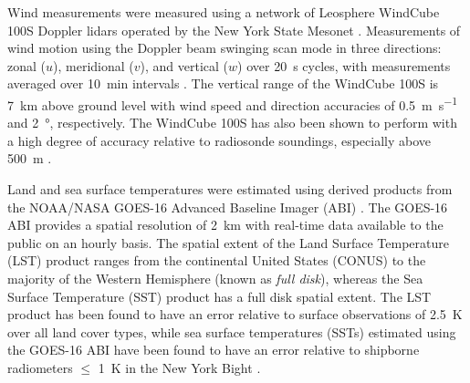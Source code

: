 Wind measurements were measured using a network of Leosphere WindCube 100S Doppler lidars operated by the New York State Mesonet \citep{brotzge2020}. Measurements of wind motion using the Doppler beam swinging scan mode in three directions: zonal ($u$), meridional ($v$), and vertical ($w$) over \SI{20}{\second} cycles, with measurements averaged over \SI{10}{\minute} intervals \citep{shrestha2021}. The vertical range of the WindCube 100S is \SI{7}{\kilo\meter} above ground level with wind speed and direction accuracies of \SI{0.5}{\meter\per\second} and \SI{2}{\degree}, respectively. The WindCube 100S has also been shown to perform with a high degree of accuracy relative to radiosonde soundings, especially above \SI{500}{\meter} \citep{kumer2014}.

Land and sea surface temperatures were estimated using derived products from the NOAA/NASA GOES-16 Advanced Baseline Imager (ABI) \citep{ignatov2010, yu2008}. The GOES-16 ABI provides a spatial resolution of \SI{2}{\kilo\meter} with real-time data available to the public on an hourly basis. The spatial extent of the Land Surface Temperature (LST) product ranges from the continental United States (CONUS) to the majority of the Western Hemisphere (known as \textit{full disk}), whereas the Sea Surface Temperature (SST) product has a full disk spatial extent. The LST product has been found to have an error relative to surface observations of \SI{2.5}{K} over all land cover types, while sea surface temperatures (SSTs) estimated using the GOES-16 ABI have been found to have an error relative to shipborne radiometers $\leq$ \SI{1}{\kelvin} in the New York Bight \citep{luo2021}.

